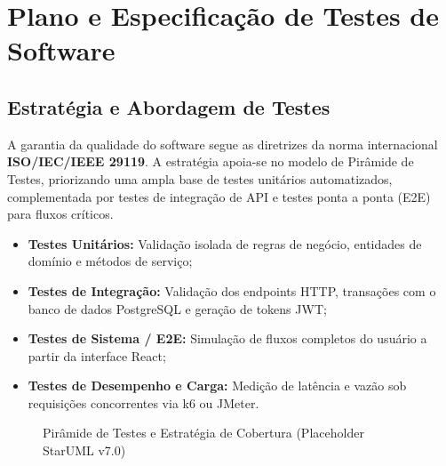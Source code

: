 \chapter{Plano e Especificação de Testes de Software}
\label{chap:plano_testes}

\section{Estratégia e Abordagem de Testes}
A garantia da qualidade do software segue as diretrizes da norma internacional \textbf{ISO/IEC/IEEE 29119}. A estratégia apoia-se no modelo de Pirâmide de Testes, priorizando uma ampla base de testes unitários automatizados, complementada por testes de integração de API e testes ponta a ponta (E2E) para fluxos críticos.

\begin{itemize}
    \item \textbf{Testes Unitários:} Validação isolada de regras de negócio, entidades de domínio e métodos de serviço;
    \item \textbf{Testes de Integração:} Validação dos endpoints HTTP, transações com o banco de dados PostgreSQL e geração de tokens JWT;
    \item \textbf{Testes de Sistema / E2E:} Simulação de fluxos completos do usuário a partir da interface React;
    \item \textbf{Testes de Desempenho e Carga:} Medição de latência e vazão sob requisições concorrentes via k6 ou JMeter.
\end{itemize}

\begin{figure}[htbp]
    \centering
    \caption{Pirâmide de Testes e Estratégia de Cobertura (Placeholder StarUML v7.0)}
    \label{fig:test_piramide}
\end{figure}

